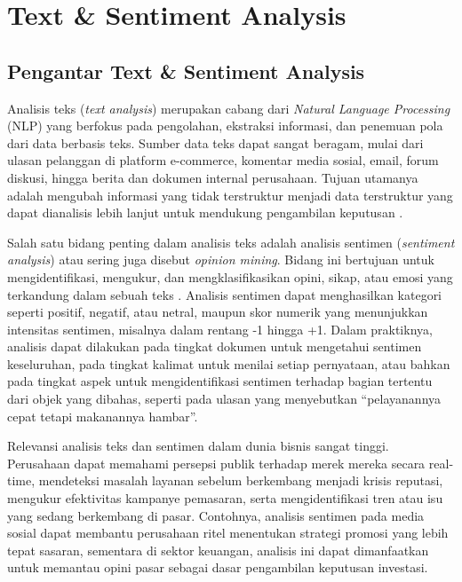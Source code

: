 \chapter{Text \& Sentiment Analysis}

\section{Pengantar Text \& Sentiment Analysis}

Analisis teks (\textit{text analysis}) merupakan cabang dari \textit{Natural Language Processing} (NLP) yang berfokus pada pengolahan, ekstraksi informasi, dan penemuan pola dari data berbasis teks. Sumber data teks dapat sangat beragam, mulai dari ulasan pelanggan di platform e-commerce, komentar media sosial, email, forum diskusi, hingga berita dan dokumen internal perusahaan. Tujuan utamanya adalah mengubah informasi yang tidak terstruktur menjadi data terstruktur yang dapat dianalisis lebih lanjut untuk mendukung pengambilan keputusan \cite{cambria2017sentiment}. 

Salah satu bidang penting dalam analisis teks adalah analisis sentimen (\textit{sentiment analysis}) atau sering juga disebut \textit{opinion mining}. Bidang ini bertujuan untuk mengidentifikasi, mengukur, dan mengklasifikasikan opini, sikap, atau emosi yang terkandung dalam sebuah teks \cite{liu2012sentiment}. Analisis sentimen dapat menghasilkan kategori seperti positif, negatif, atau netral, maupun skor numerik yang menunjukkan intensitas sentimen, misalnya dalam rentang -1 hingga +1. Dalam praktiknya, analisis dapat dilakukan pada tingkat dokumen untuk mengetahui sentimen keseluruhan, pada tingkat kalimat untuk menilai setiap pernyataan, atau bahkan pada tingkat aspek untuk mengidentifikasi sentimen terhadap bagian tertentu dari objek yang dibahas, seperti pada ulasan yang menyebutkan “pelayanannya cepat tetapi makanannya hambar”.

Relevansi analisis teks dan sentimen dalam dunia bisnis sangat tinggi. Perusahaan dapat memahami persepsi publik terhadap merek mereka secara real-time, mendeteksi masalah layanan sebelum berkembang menjadi krisis reputasi, mengukur efektivitas kampanye pemasaran, serta mengidentifikasi tren atau isu yang sedang berkembang di pasar. Contohnya, analisis sentimen pada media sosial dapat membantu perusahaan ritel menentukan strategi promosi yang lebih tepat sasaran, sementara di sektor keuangan, analisis ini dapat dimanfaatkan untuk memantau opini pasar sebagai dasar pengambilan keputusan investasi.

